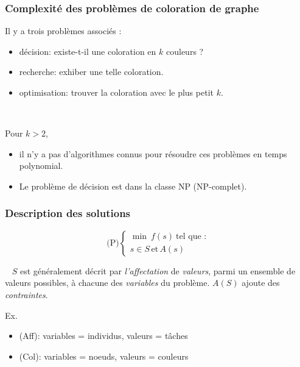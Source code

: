 \documentclass{beamer}
\begin{document}
\begin{frame}
  \frametitle{Complexité des problèmes de coloration de graphe}


  Il y a trois problèmes associés :
  \begin{itemize}
    \item décision:
      existe-t-il une coloration en $k$ couleurs ?
    \item recherche:
      exhiber une telle coloration.
    \item optimisation:
      trouver la coloration avec le plus petit $k$. %
  \end{itemize}

  ~
  
  Pour $k > 2$,
  \begin{itemize}
  \item il n'y a pas d'algorithmes connus pour
    résoudre ces problèmes en temps polynomial.
  \item Le problème de décision est dans la classe NP
    (NP-complet).
  \end{itemize}
\end{frame}

\begin{frame}
  \frametitle{Description des solutions}

  \[
  \text{(P)} \left\{
  \begin{array}{c}
    \min \ f(s) \ \text{tel que :} \\
    s \in S \, \text{et} \, A(s)
  \end{array}
  \right.
  \]

  \begin{block}{~}
  $S$ est généralement décrit par \emph{l'affectation} de \emph{valeurs}, parmi un ensemble de valeurs possibles, à chacune des \emph{variables} du problème. $A(S)$ ajoute des \emph{contraintes}.
  \end{block}
  
  \begin{exampleblock}{Ex. }
    \begin{itemize}
    \item (Aff): variables = individus, valeurs = tâches
    \item (Col): variables = noeuds, valeurs = couleurs
    \end{itemize}
  \end{exampleblock}
  
\end{frame}
\end{document}
